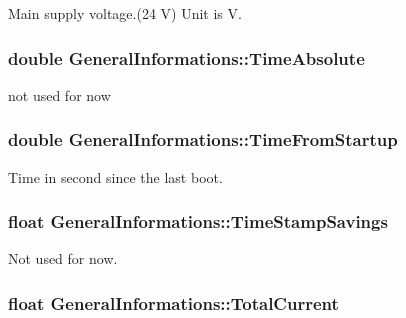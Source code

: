 Main supply voltage.(24 V) Unit is V. 

\subsubsection[{\texorpdfstring{Time\+Absolute}{TimeAbsolute}}]{\setlength{\rightskip}{0pt plus 5cm}double General\+Informations\+::\+Time\+Absolute}\hypertarget{struct_general_informations_ab2950271f954d901892257e5364e0d64}{}\label{struct_general_informations_ab2950271f954d901892257e5364e0d64}


not used for now 

\subsubsection[{\texorpdfstring{Time\+From\+Startup}{TimeFromStartup}}]{\setlength{\rightskip}{0pt plus 5cm}double General\+Informations\+::\+Time\+From\+Startup}\hypertarget{struct_general_informations_ab88ee4b89e5244ada283aa21dd33bd39}{}\label{struct_general_informations_ab88ee4b89e5244ada283aa21dd33bd39}


Time in second since the last boot. 

\subsubsection[{\texorpdfstring{Time\+Stamp\+Savings}{TimeStampSavings}}]{\setlength{\rightskip}{0pt plus 5cm}float General\+Informations\+::\+Time\+Stamp\+Savings}\hypertarget{struct_general_informations_a9175b100c45576a34acd3524e00d7d0c}{}\label{struct_general_informations_a9175b100c45576a34acd3524e00d7d0c}


Not used for now. 

\subsubsection[{\texorpdfstring{Total\+Current}{TotalCurrent}}]{\setlength{\rightskip}{0pt plus 5cm}float General\+Informations\+::\+Total\+Current}\hypertarget{struct_general_informations_a6bce22c0c87b7c9696968182a8463a3e}{}\label{struct_general_informations_a6bce22c0c87b7c9696968182a8463a3e}


